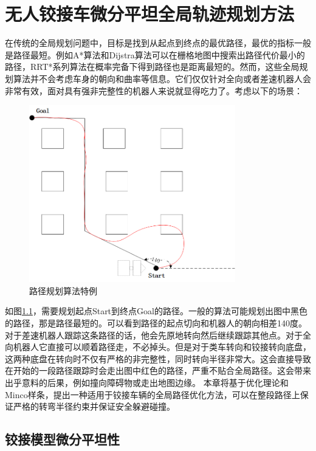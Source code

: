 \documentclass[master,academic]{ysuthesis} %
\begin{document}
	\chapter{无人铰接车微分平坦全局轨迹规划方法}
		在传统的全局规划问题中，目标是找到从起点到终点的最优路径，最优的指标一般是路径最短。例如A*算法和Dijstra算法可以在栅格地图中搜索出路径代价最小的路径，RRT*系列算法在概率完备下得到路径也是距离最短的。然而，这些全局规划算法并不会考虑车身的朝向和曲率等信息。它们仅仅针对全向或者差速机器人会非常有效，面对具有强非完整性的机器人来说就显得吃力了。考虑以下的场景：  
		\begin{figure}[!ht]
			\centering
			\includegraphics[width=0.8\textwidth]{路径规划算法特例.png}
			\caption{路径规划算法特例}
			\label{fig:路径规划算法特例}
		\end{figure}

		如图\ref{fig:路径规划算法特例}，需要规划起点Start到终点Goal的路径。一般的算法可能规划出图中黑色的路径，那是路径最短的。可以看到路径的起点切向和机器人的朝向相差140度。对于差速机器人跟踪这条路径的话，他会先原地转向然后继续跟踪其他点。对于全向机器人它直接可以顺着路径走，不必掉头。但是对于类车转向和铰接转向底盘，这两种底盘在转向时不仅有严格的非完整性，同时转向半径非常大。这会直接导致在开始的一段路径跟踪时会走出图中红色的路径，严重不贴合全局路径。这会带来出乎意料的后果，例如撞向障碍物或走出地图边缘。
		本章将基于优化理论和Minco样条，提出一种适用于铰接车辆的全局路径优化方法，可以在整段路径上保证严格的转弯半径约束并保证安全躲避碰撞。
		
	\section{铰接模型微分平坦性}
\end{document}
